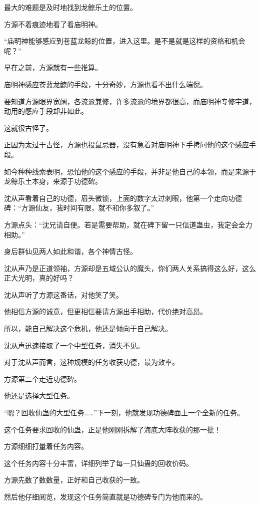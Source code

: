 \begin{this_body}
最大的难题是及时地找到龙鲸乐土的位置。

方源不着痕迹地看了看庙明神。

“庙明神能够感应到苍蓝龙鲸的位置，进入这里。是不是就是这样的资格和机会呢？”

早在之前，方源就有一些推算。

庙明神感应苍蓝龙鲸的手段，十分奇妙，方源也看不出什么端倪。

要知道方源眼界宽阔，各流派兼修，许多流派的境界都很高，而庙明神专修宇道，动用的感应手段却非如此。

这就很古怪了。

正因为太过于古怪，方源也投鼠忌器，没有急着对庙明神下手拷问他的这个感应手段。

如今种种线索表明，恐怕他的这个感应的手段，并非是他自己的本领，而是来源于龙鲸乐土本身，来源于功德碑。

沈从声看着自己的功德，眉头微锁，上面的数字太过刺眼，他第一个走向功德碑：“方源仙友，我时间有限，就不和你多叙了。”

方源点头：“沈兄请自便。若是需要帮助，就在碑下留一只信道蛊虫，我定会全力相助。”

身后群仙见两人如此和谐，各个神情古怪。

沈从声乃是正道领袖，方源却是五域公认的魔头，你们两人关系搞得这么好，这么正大光明，真的好吗？

沈从声听了方源这番话，对他笑了笑。

他相信方源的诚意，但更相信要请方源出手相助，代价绝对高昂。

所以，能自己解决这个危机，他还是倾向于自己解决。

沈从声迅速接取了一个中型任务，消失不见。

对于沈从声而言，这种规模的任务收获功德，最为效率。

方源第二个走近功德碑。

他还是选择大型任务。

“嗯？回收仙蛊的大型任务……”下一刻，他就发现功德碑面上一个全新的任务。

这个任务要求回收的仙蛊，正是他刚刚拆解了海底大阵收获的那一批！

方源细细打量着任务内容。

这个任务内容十分丰富，详细列举了每一只仙蛊的回收价码。

方源先数了数数量，正好和自己收获的一致。

然后他仔细阅览，发现这个任务简直就是功德碑专门为他而来的。


\end{this_body}
